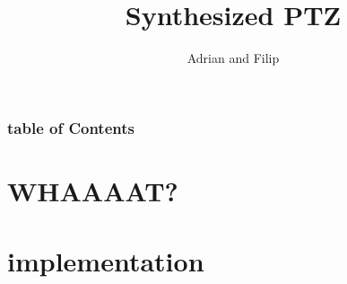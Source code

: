 \documentclass[9pt]{beamer}
\title{Synthesized PTZ}
\author{Adrian and Filip}
\begin{document}
\maketitle
\begin{frame}
	\frametitle{table of Contents}
	\tableofcontents
\end{frame}

\section{WHAAAAT?}
\begin{frame}
\end{frame}

\section{implementation}
\end{document}
